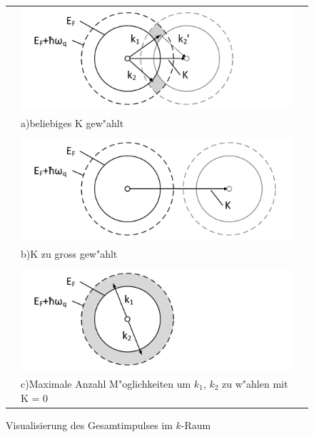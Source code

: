 \begin{refsection}
\begin{figure}
\centering
  \begin{tabular}{l l l}
  \centering
    &
    \begin{minipage}{0.6\textwidth}
	\includegraphics[width=1.1\textwidth]{supraleitung/Graphics/kGraphic05g.pdf}
    \end{minipage}
    &
    \\
    &
    a)\quad beliebiges K gew"ahlt 			%
    \\
    &
    \\
    &
    \begin{minipage}{0.6\textwidth}
	\includegraphics[width=1.1\textwidth]{supraleitung/Graphics/kGraphic06g.pdf} 
    \end{minipage}
    &
    \\
    &
    b)\quad K zu gross gew"ahlt							%
    \\
    &
    \\
    &
    \begin{minipage}{0.6\textwidth}
	\includegraphics[width=1.1\textwidth]{supraleitung/Graphics/kGraphic09g.pdf}
    \end{minipage}
    &
    \\
    &
    c)\quad Maximale Anzahl M"oglichkeiten um $k_1$, $k_2$ zu w"ahlen mit K = 0 	%
    &
    \\
  \end{tabular}
  \caption{Visualisierung des Gesamtimpulses im $k$-Raum
  \label{supraleitung:kRaum}}
\end{figure}


\end{refsection}

